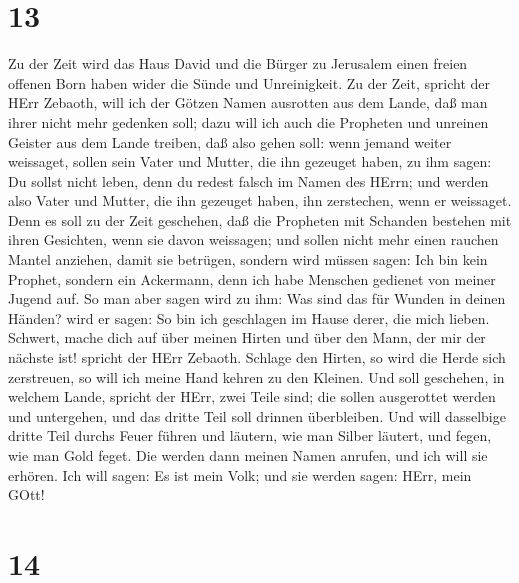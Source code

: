 \hypertarget{section-12}{%
\section{13}\label{section-12}}

 Zu der Zeit wird das Haus David und die Bürger zu Jerusalem
einen freien offenen Born haben wider die Sünde und Unreinigkeit.
 Zu der Zeit, spricht der HErr Zebaoth, will ich der Götzen
Namen ausrotten aus dem Lande, daß man ihrer nicht mehr gedenken soll;
dazu will ich auch die Propheten und unreinen Geister aus dem Lande
treiben,  daß also gehen soll: wenn jemand weiter weissaget,
sollen sein Vater und Mutter, die ihn gezeuget haben, zu ihm sagen: Du
sollst nicht leben, denn du redest falsch im Namen des HErrn; und werden
also Vater und Mutter, die ihn gezeuget haben, ihn zerstechen, wenn er
weissaget.  Denn es soll zu der Zeit geschehen, daß die
Propheten mit Schanden bestehen mit ihren Gesichten, wenn sie davon
weissagen; und sollen nicht mehr einen rauchen Mantel anziehen, damit
sie betrügen,  sondern wird müssen sagen: Ich bin kein
Prophet, sondern ein Ackermann, denn ich habe Menschen gedienet von
meiner Jugend auf.  So man aber sagen wird zu ihm: Was sind
das für Wunden in deinen Händen? wird er sagen: So bin ich geschlagen im
Hause derer, die mich lieben.  Schwert, mache dich auf über
meinen Hirten und über den Mann, der mir der nächste ist! spricht der
HErr Zebaoth. Schlage den Hirten, so wird die Herde sich zerstreuen, so
will ich meine Hand kehren zu den Kleinen.  Und soll
geschehen, in welchem Lande, spricht der HErr, zwei Teile sind; die
sollen ausgerottet werden und untergehen, und das dritte Teil soll
drinnen überbleiben.  Und will dasselbige dritte Teil durchs
Feuer führen und läutern, wie man Silber läutert, und fegen, wie man
Gold feget. Die werden dann meinen Namen anrufen, und ich will sie
erhören. Ich will sagen: Es ist mein Volk; und sie werden sagen: HErr,
mein GOtt!

\hypertarget{section-13}{%
\section{14}\label{section-13}}

